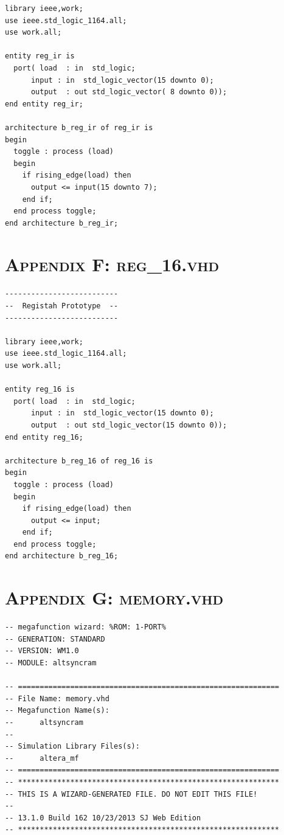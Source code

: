 \documentclass[11pt]{report}
\begin{document}
\begin{spacing}{1.5}
\begin{lstlisting}
library ieee,work;
use ieee.std_logic_1164.all;
use work.all;

entity reg_ir is
  port( load  : in  std_logic;
      input : in  std_logic_vector(15 downto 0);
      output  : out std_logic_vector( 8 downto 0));
end entity reg_ir;

architecture b_reg_ir of reg_ir is
begin
  toggle : process (load)
  begin
    if rising_edge(load) then
      output <= input(15 downto 7);
    end if;
  end process toggle;
end architecture b_reg_ir;
\end{lstlisting}

\chapter*{\scshape Appendix F: reg\_16.vhd}
\label{app:a}
\vspace{15px}
\begin{lstlisting}
--------------------------
--  Registah Prototype  --
--------------------------

library ieee,work;
use ieee.std_logic_1164.all;
use work.all;

entity reg_16 is
  port( load  : in  std_logic;
      input : in  std_logic_vector(15 downto 0);
      output  : out std_logic_vector(15 downto 0));
end entity reg_16;

architecture b_reg_16 of reg_16 is
begin
  toggle : process (load)
  begin
    if rising_edge(load) then
      output <= input;
    end if;
  end process toggle;
end architecture b_reg_16;
\end{lstlisting}

\chapter*{\scshape Appendix G: memory.vhd}
\label{app:a}
\vspace{15px}
\begin{lstlisting}
-- megafunction wizard: %ROM: 1-PORT%
-- GENERATION: STANDARD
-- VERSION: WM1.0
-- MODULE: altsyncram 

-- ============================================================
-- File Name: memory.vhd
-- Megafunction Name(s):
--      altsyncram
--
-- Simulation Library Files(s):
--      altera_mf
-- ============================================================
-- ************************************************************
-- THIS IS A WIZARD-GENERATED FILE. DO NOT EDIT THIS FILE!
--
-- 13.1.0 Build 162 10/23/2013 SJ Web Edition
-- ************************************************************



\end{lstlisting}
\end{spacing}
\end{document}
